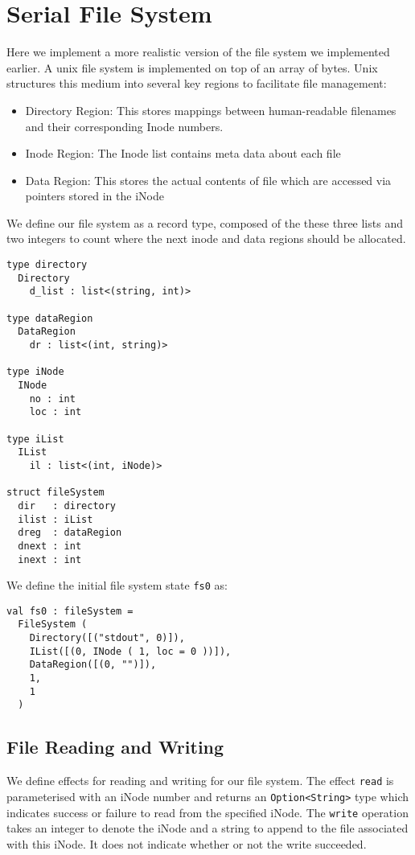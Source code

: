 \documentclass[logo,bsc,singlespacing,parskip]{infthesis}
\begin{document}
\section{Serial File System}
Here we implement a more realistic version of the file system we implemented earlier. A unix file system is implemented on top of an array of bytes. Unix structures this medium into several key regions to facilitate file management:
\begin{itemize}
    \item Directory Region: This stores mappings between human-readable filenames and their corresponding Inode numbers.
    \item Inode Region: The Inode list contains meta data about each file
    \item Data Region: This stores the actual contents of file which are accessed via pointers stored in the iNode
\end{itemize}

We define our file system as a record type, composed of the these three lists and two integers to count where the next inode and data regions should be allocated.

\begin{lstlisting}
type directory 
  Directory
    d_list : list<(string, int)>

type dataRegion 
  DataRegion
    dr : list<(int, string)>

type iNode
  INode
    no : int
    loc : int

type iList 
  IList
    il : list<(int, iNode)> 

struct fileSystem
  dir   : directory
  ilist : iList
  dreg  : dataRegion
  dnext : int
  inext : int

\end{lstlisting}

We define the initial file system state \texttt{fs0} as:
\begin{lstlisting}
val fs0 : fileSystem =
  FileSystem (
    Directory([("stdout", 0)]),
    IList([(0, INode ( 1, loc = 0 ))]),
    DataRegion([(0, "")]),
    1,
    1
  )
\end{lstlisting}

\subsection{File Reading and Writing}

We define effects for reading and writing for our file system. The effect \texttt{read} is parameterised with an iNode number and returns an \texttt{Option<String>} type which indicates success or failure to read from the specified iNode. The \texttt{write} operation takes an integer to denote the iNode and a string to append to the file associated with this iNode. It does not indicate whether or not the write succeeded.
\end{document}
